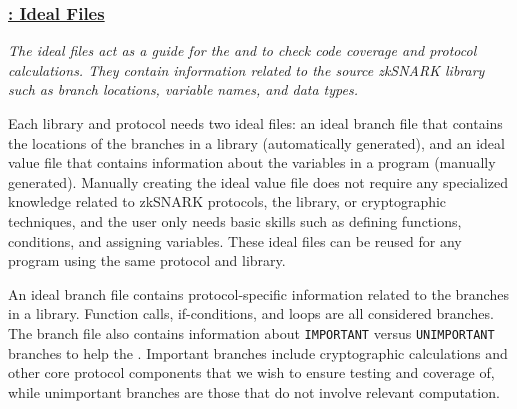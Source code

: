 \subsubsection*{\underline{\SnarkFuzzer: Ideal Files}}
\label{subsec:snarkprobe-ideal-files}

 \emph{The ideal files act as a guide for the \branchmodel and  to check code coverage and protocol calculations. They contain information related to the source zkSNARK library such as branch locations, variable names, and data types.}

%
Each library and protocol needs two ideal files: an ideal branch file that contains the locations of the branches in a library (automatically generated), and an ideal value file that contains information about the variables in a program (manually generated).  
Manually creating the ideal value file does not require any specialized knowledge related to zkSNARK protocols, the library, or cryptographic techniques, and the user only needs basic skills such as defining functions, conditions, and assigning variables.
These ideal files can be reused for any program using the same protocol and library.

%
An ideal branch file contains protocol-specific information related to the branches in a library.  Function calls, if-conditions, and loops are all considered branches.
The branch file also contains information about \texttt{IMPORTANT} versus \texttt{UNIMPORTANT} branches to help the .  Important branches include cryptographic calculations and other core protocol components that we wish to ensure testing and coverage of, while unimportant branches are those that do not involve relevant computation.

%

